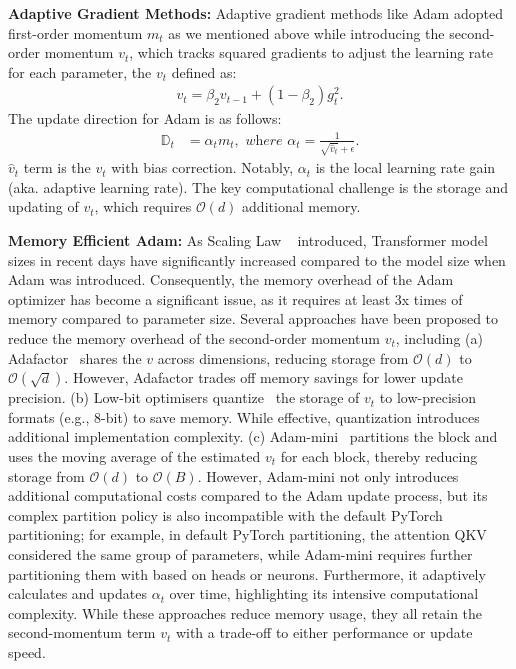 \textbf{Adaptive Gradient Methods:} Adaptive gradient methods like Adam adopted first-order momentum \(m_t\) as we mentioned above while introducing the second-order momentum \(v_t\), which tracks squared gradients to adjust the learning rate for each parameter, the \(v_t\) defined as:
\begin{align}
    v_t = \beta_2 v_{t-1} + (1-\beta_2) g_t^2.
\end{align}
The update direction for Adam is as follows:
\begin{align}
    \mathbb{D}_t&= \alpha_t m_t,
    \textit{ where }
    \alpha_t = \frac{1}{\sqrt{\hat{v}_t} + \epsilon}.
\end{align}
$\hat{v}_t$ term is the $v_t$ with bias correction.
Notably, $\alpha_t$ is the local learning rate gain (aka. adaptive learning rate). The key computational challenge is the storage and updating of 
$v_t$, which requires $\mathcal{O}(d)$ additional memory.


\textbf{Memory Efficient Adam:}
As Scaling Law ~\cite{kaplan2020scaling} introduced, Transformer model sizes in recent days have significantly increased compared to the model size when Adam was introduced. Consequently, the memory overhead of the Adam optimizer has become a significant issue, as it requires at least 3x times of memory compared to parameter size. 
Several approaches have been proposed to reduce the memory overhead of the second-order momentum $v_t$, including (a) Adafactor~\cite{shazeer2018adafactor} shares the $v$ across dimensions, reducing storage from $\mathcal{O}(d)$ to $\mathcal{O}(\sqrt{d})$. However, Adafactor trades off memory savings for lower update precision. (b) Low-bit optimisers quantize~\cite{DBLP:journals/corr/abs-2110-02861} the storage of $v_t$ to low-precision formats (e.g., 8-bit) to save memory. While effective, quantization introduces additional implementation complexity. (c) Adam-mini~\cite{zhang2024adamminiusefewerlearning} partitions the block and uses the moving average of the estimated $v_t$ for each block, thereby reducing storage from $\mathcal{O}(d)$ to $\mathcal{O}(B)$. However, Adam-mini not only introduces additional computational costs compared to the Adam update process, but its complex partition policy is also incompatible with the default PyTorch partitioning; for example, in default PyTorch partitioning, the attention QKV considered the same group of parameters,  while Adam-mini requires further partitioning them with based on heads or neurons. Furthermore, it adaptively calculates and updates $\alpha_t$ over time, highlighting its intensive computational complexity. While these approaches reduce memory usage, they all retain the second-momentum term $v_t$ with a trade-off to either performance or update speed.

